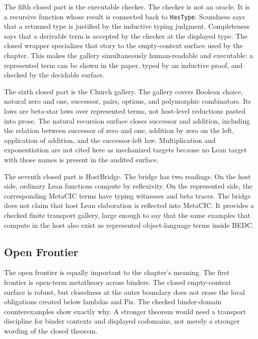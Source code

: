 The fifth closed part is the executable checker.  The checker is not an
oracle.  It is a recursive function whose result is connected back to
\texttt{HasType}.  Soundness says that a returned type is justified by the
inductive typing judgment.  Completeness says that a derivable term is
accepted by the checker at the displayed type.  The closed wrapper specializes
that story to the empty-context surface used by the chapter.  This makes the
gallery simultaneously human-readable and executable: a represented term can
be shown in the paper, typed by an inductive proof, and checked by the
decidable surface.

The sixth closed part is the Church gallery.  The gallery covers Boolean
choice, natural zero and one, successor, pairs, options, and polymorphic
combinators.  Its laws are beta-star laws over represented terms, not
host-level reductions pasted into prose.  The natural recursion surface closes
successor and addition, including the relation between successor of zero and
one, addition by zero on the left, application of addition, and the
successor-left law.  Multiplication and exponentiation are not cited here as
mechanized targets because no Lean target with those names is present in the
audited surface.

The seventh closed part is HostBridge.  The bridge has two readings.  On the
host side, ordinary Lean functions compute by reflexivity.  On the represented
side, the corresponding MetaCIC terms have typing witnesses and beta traces.
The bridge does not claim that host Lean elaboration is reflected into
MetaCIC.  It provides a checked finite transport gallery, large enough to say
that the same examples that compute in the host also exist as represented
object-language terms inside BEDC.

\subsection{Open Frontier}
\label{subsec:session-closing-open-frontier}

The open frontier is equally important to the chapter's meaning.  The first
frontier is open-term metatheory across binders.  The closed empty-context
surface is robust, but closedness at the outer boundary does not erase the
local obligations created below lambdas and Pis.  The checked binder-domain
counterexamples show exactly why.  A stronger theorem would need a transport
discipline for binder contexts and displayed codomains, not merely a stronger
wording of the closed theorem.


